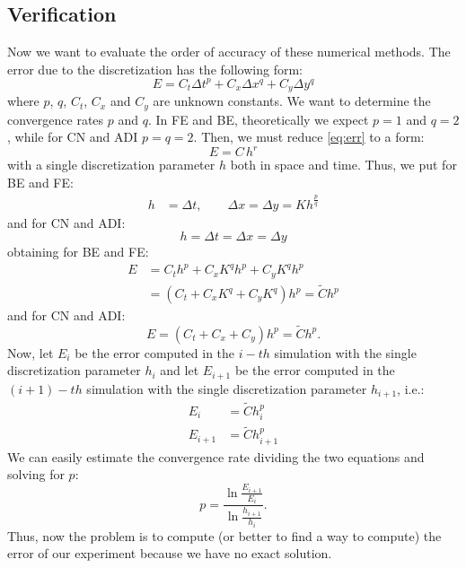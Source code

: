 \subsection{Verification}

Now we want to evaluate the order of accuracy of these numerical methods.
The error due to the discretization has the following form: 
\begin{equation}
E=C_{t}\Delta t^{p}+C_{x}\Delta x^{q}+C_{y}\Delta y^{q}\label{eq:err}
\end{equation}
where $p$, $q$, $C_{t}$, $C_{x}$ and $C_{y}$ are unknown constants.
We want to determine the convergence rates $p$ and $q$. In FE and
BE, theoretically we expect $p=1$ and $q=2$, while for CN and ADI
$p=q=2$. Then, we must reduce \ref{eq:err} to a form: 
\[
E=C\,h^{r}
\]
 with a single discretization parameter $h$ both in space and time.
Thus, we put for BE and FE:
\begin{align*}
h & =\Delta t,\qquad\Delta x=\Delta y=Kh^{\frac{p}{q}}
\end{align*}
and for CN and ADI:
\[
h=\Delta t=\Delta x=\Delta y
\]
obtaining for BE and FE:
\begin{align*}
E & =C_{t}h^{p}+C_{x}K^{q}h^{p}+C_{y}K^{q}h^{p}\\
 & =\left(C_{t}+C_{x}K^{q}+C_{y}K^{q}\right)h^{p}=\tilde{C}h^{p}
\end{align*}
and for CN and ADI:
\[
E=\left(C_{t}+C_{x}+C_{y}\right)h^{p}=\tilde{C}h^{p}.
\]
Now, let $E_{i}$ be the error computed in the $i-th$ simulation
with the single discretization parameter $h_{i}$ and let $E_{i+1}$
be the error computed in the $\left(i+1\right)-th$ simulation with
the single discretization parameter $h_{i+1}$, i.e.:
\begin{align*}
E_{i} & =\tilde{C}h_{i}^{p}\\
E_{i+1} & =\tilde{C}h_{i+1}^{p}
\end{align*}
We can easily estimate the convergence rate dividing the two equations
and solving for $p$:
\begin{equation}
p=\frac{\ln\frac{E_{i+1}}{E_{i}}}{\ln\frac{h_{i+1}}{h_{i}}}.\label{eq:conv_rate}
\end{equation}
Thus, now the problem is to compute (or better to find a way to compute)
the error of our experiment because we have no exact solution.

